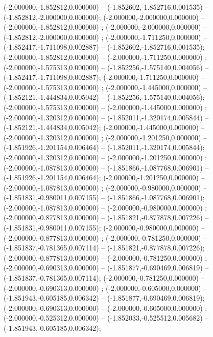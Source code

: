  (-2.000000,-1.852812,0.000000) -- (-1.852602,-1.852716,0.001535) -- (-1.852812,-2.000000,0.000000);
 (-2.000000,-2.000000,0.000000) -- (-2.000000,-1.852812,0.000000) ;
 (-2.000000,-2.000000,0.000000) -- (-1.852812,-2.000000,0.000000) ;
 (-2.000000,-1.711250,0.000000) -- (-1.852417,-1.711098,0.002887) -- (-1.852602,-1.852716,0.001535);
 (-2.000000,-1.852812,0.000000) -- (-2.000000,-1.711250,0.000000) ;
 (-2.000000,-1.575313,0.000000) -- (-1.852256,-1.575140,0.004056) -- (-1.852417,-1.711098,0.002887);
 (-2.000000,-1.711250,0.000000) -- (-2.000000,-1.575313,0.000000) ;
 (-2.000000,-1.445000,0.000000) -- (-1.852121,-1.444834,0.005042) -- (-1.852256,-1.575140,0.004056);
 (-2.000000,-1.575313,0.000000) -- (-2.000000,-1.445000,0.000000) ;
 (-2.000000,-1.320312,0.000000) -- (-1.852011,-1.320174,0.005844) -- (-1.852121,-1.444834,0.005042);
 (-2.000000,-1.445000,0.000000) -- (-2.000000,-1.320312,0.000000) ;
 (-2.000000,-1.201250,0.000000) -- (-1.851926,-1.201154,0.006464) -- (-1.852011,-1.320174,0.005844);
 (-2.000000,-1.320312,0.000000) -- (-2.000000,-1.201250,0.000000) ;
 (-2.000000,-1.087813,0.000000) -- (-1.851866,-1.087768,0.006901) -- (-1.851926,-1.201154,0.006464);
 (-2.000000,-1.201250,0.000000) -- (-2.000000,-1.087813,0.000000) ;
 (-2.000000,-0.980000,0.000000) -- (-1.851831,-0.980011,0.007155) -- (-1.851866,-1.087768,0.006901);
 (-2.000000,-1.087813,0.000000) -- (-2.000000,-0.980000,0.000000) ;
 (-2.000000,-0.877813,0.000000) -- (-1.851821,-0.877878,0.007226) -- (-1.851831,-0.980011,0.007155);
 (-2.000000,-0.980000,0.000000) -- (-2.000000,-0.877813,0.000000) ;
 (-2.000000,-0.781250,0.000000) -- (-1.851837,-0.781365,0.007114) -- (-1.851821,-0.877878,0.007226);
 (-2.000000,-0.877813,0.000000) -- (-2.000000,-0.781250,0.000000) ;
 (-2.000000,-0.690313,0.000000) -- (-1.851877,-0.690469,0.006819) -- (-1.851837,-0.781365,0.007114);
 (-2.000000,-0.781250,0.000000) -- (-2.000000,-0.690313,0.000000) ;
 (-2.000000,-0.605000,0.000000) -- (-1.851943,-0.605185,0.006342) -- (-1.851877,-0.690469,0.006819);
 (-2.000000,-0.690313,0.000000) -- (-2.000000,-0.605000,0.000000) ;
 (-2.000000,-0.525312,0.000000) -- (-1.852033,-0.525512,0.005682) -- (-1.851943,-0.605185,0.006342);
